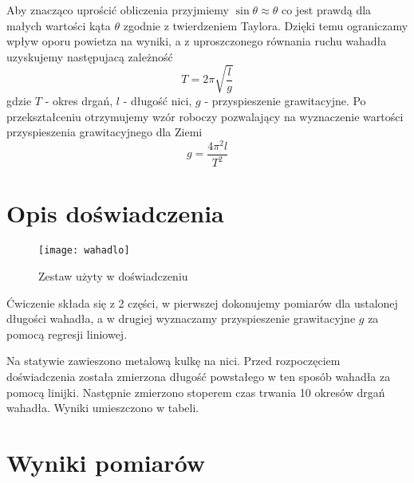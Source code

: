 \documentclass[a4paper,10pt,twoside]{article}
\begin{document}
Aby znacząco uprościć obliczenia przyjmiemy $\sin\theta\approx\theta$ co jest prawdą dla małych wartości kąta $\theta$ zgodnie z
twierdzeniem Taylora. Dzięki temu ograniczamy wpływ oporu powietza na wyniki, a z uproszczonego równania ruchu wahadła
uzyskujemy następujacą zależność
\begin{equation}
T=2\pi\sqrt{\frac{l}{g}}
\end{equation}
gdzie $T$ - okres drgań, $l$ - długość nici, $g$ - przyspieszenie grawitacyjne. Po przekształceniu otrzymujemy wzór roboczy pozwalający
na wyznaczenie wartości przyspieszenia grawitacyjnego dla Ziemi
\begin{equation}
\label{eq:working_g}
g=\frac{4\pi^2l}{T^2}
\end{equation}
	
\section{Opis doświadczenia}

\begin{figure}[!htp]
\centerline{\texttt{[image: wahadlo]}}
\caption{Zestaw użyty w doświadczeniu}
\end{figure}
Ćwiczenie składa się z 2 części, w pierwszej dokonujemy pomiarów dla ustalonej długości wahadła, a w drugiej wyznaczamy
przyspieszenie grawitacyjne $g$ za pomocą regresji liniowej.

Na statywie zawieszono metalową kulkę na nici. Przed rozpoczęciem doświadczenia została zmierzona długość powstałego w ten sposób
wahadła za pomocą linijki. Następnie zmierzono stoperem czas trwania 10 okresów drgań wahadła. Wyniki umieszczono w tabeli.

\newpage
\section{Wyniki pomiarów}
\end{document}
